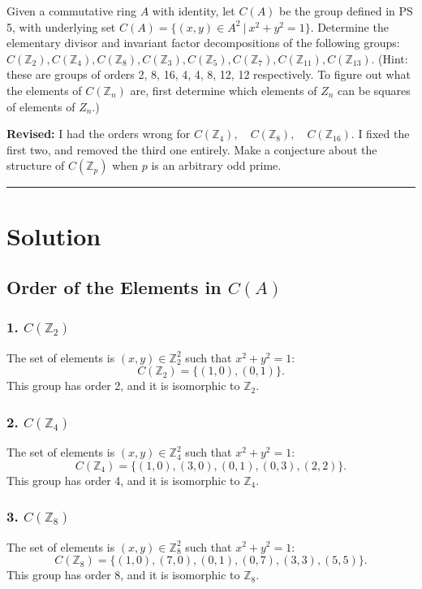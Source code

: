 \documentclass[12pt]{amsart}
\theoremstyle{definition}
\numberwithin{equation}{section}
\newcommand{\Z}{\mathbb{Z}}
\begin{document}
\newpage
\begin{exercise}{9} Given a commutative ring \(A\) with identity, let \(C(A)\) be the group defined in PS 5, with underlying set \(C(A)= \{(x,y) \in A^2 \ | \ x^2 + y^2 = 1\} \). Determine the elementary divisor and invariant factor decompositions of the following groups: \(C(\Z_2), C(\Z_4), C(\Z_8), C(\Z_3), C(\Z_5), C(\Z_7), C(\Z_{11}), C(\Z_{13})\). (Hint: these are groups of orders 2, 8, 16, 4, 4, 8, 12, 12 respectively. To figure out what the elements of \(C(\Z_n)\) are, first determine which elements of \(Z_n\) can be squares of elements of \(Z_n\).)
    
    \textbf{Revised:} I had the orders wrong for \(C(\Z_4), \quad C(\Z_8), \quad C(\Z_{16})\). I fixed the first two, and removed the third one entirely. Make a conjecture about the structure of \(C(\Z_p)\) when \(p\) is an arbitrary odd prime. 

    \noindent\rule{\linewidth}{1pt}

    \section*{Solution}

    \subsection*{Order of the Elements in \(C(A)\)}

    \subsubsection*{1. \(C(\Z_2)\)}
    The set of elements is \((x, y) \in \Z_2^2\) such that \(x^2 + y^2 = 1\):
    \[
    C(\Z_2) = \{(1, 0), (0, 1)\}.
    \]
    This group has order 2, and it is isomorphic to \(\Z_2\).

    \subsubsection*{2. \(C(\Z_4)\)}
    The set of elements is \((x, y) \in \Z_4^2\) such that \(x^2 + y^2 = 1\):
    \[
    C(\Z_4) = \{(1, 0), (3, 0), (0, 1), (0, 3), (2, 2)\}.
    \]
    This group has order 4, and it is isomorphic to \(\Z_4\).

    \subsubsection*{3. \(C(\Z_8)\)}
    The set of elements is \((x, y) \in \Z_8^2\) such that \(x^2 + y^2 = 1\):
    \[
    C(\Z_8) = \{(1, 0), (7, 0), (0, 1), (0, 7), (3, 3), (5, 5)\}.
    \]
    This group has order 8, and it is isomorphic to \(\Z_8\).


\end{exercise}
\end{document}
